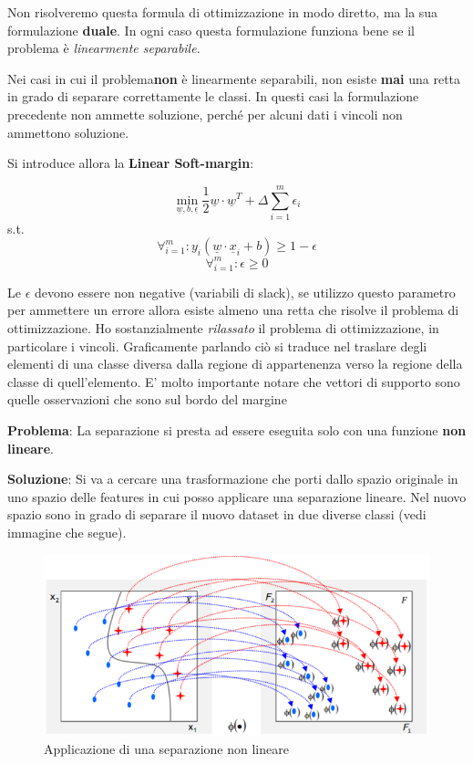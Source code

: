 Non risolveremo questa formula di ottimizzazione in modo diretto, ma la sua formulazione \textbf{duale}. In ogni caso questa formulazione funziona bene se il problema è  \textit{linearmente separabile}.

Nei casi in cui il problema\textbf{non} è linearmente separabili, non esiste \textbf{mai} una retta in grado di separare correttamente le classi. In questi casi la formulazione precedente non ammette soluzione, perché per alcuni dati i vincoli non ammettono soluzione. 

Si introduce allora la \textbf{Linear Soft-margin}:

\[ \min_{\underline{w},b,\underline{\epsilon}} \frac{1}{2}\underline{w} \cdot \underline{w}^T + \Delta \sum_{i=1}^{m} \epsilon_i \]
\qquad s.t.
\[\forall_{i=1}^m :  y_i (\underline{w} \cdot \underline{x}_i + b) \ge 1 - \epsilon \] \[\forall_{i=1}^m : \epsilon \ge 0\]

Le $\epsilon$ devono essere non negative (variabili di slack), se utilizzo questo parametro  per ammettere un errore allora esiste almeno una retta che risolve il problema di ottimizzazione. Ho sostanzialmente \textit{rilassato} il problema di ottimizzazione, in particolare i vincoli. Graficamente parlando ciò si traduce nel traslare degli elementi di una classe diversa dalla regione di appartenenza verso la regione della classe di quell'elemento.
E' molto importante notare che vettori di supporto sono quelle osservazioni che sono sul bordo del margine

\textbf{Problema}: La separazione si presta ad essere eseguita solo con una funzione \textbf{non lineare}.
 
\textbf{Soluzione}: Si va a cercare una trasformazione che porti dallo spazio originale in uno spazio delle features in cui posso applicare una separazione lineare. Nel nuovo spazio sono in grado di separare il nuovo dataset in due diverse classi (vedi immagine che segue). 

\begin{figure}[H]
	\hspace{-0.5cm}
	\includegraphics[height=0.45 \linewidth]{classification/pict/svm_nonlinear.png}
	\caption{Applicazione di una separazione non lineare}
\end{figure}

